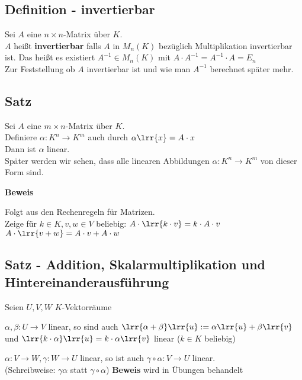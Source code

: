 \subsection{Definition - invertierbar}
	Sei $A$ eine $n\times n$-Matrix über $K$.\\
	$A$ heißt \textbf{invertierbar} falls $A$ in $M_n(K)$ bezüglich Multiplikation invertierbar ist. Das heißt es existiert $A^{-1}\in M_n(K)$ mit $A\cdot A^{-1}=A^{-1}\cdot A=E_n$ \\
	Zur Feststellung ob $A$ invertierbar ist und wie man $A^{-1}$ berechnet später mehr.
	
\subsection{Satz}
	Sei $A$ eine $m\times n$-Matrix über $K$.\\
	Definiere $\alpha:K^n\rightarrow K^m$ auch durch $\alpha\lrr{x}=A\cdot x$\\
	Dann ist $\alpha$ linear.\\
	Später werden wir sehen, dass alle linearen Abbildungen $\alpha:K^n\rightarrow K^m$ von dieser Form sind.
	
	\textbf{Beweis}
	
	Folgt aus den Rechenregeln für Matrizen.\\
	Zeige für $k\in K, v,w\in V$ beliebig: $A\cdot\lrr{k\cdot v}=k\cdot A\cdot v$\\
	$A\cdot\lrr{v+w}=A\cdot v+A\cdot w$
	
\subsection{Satz - Addition, Skalarmultiplikation und Hintereinanderausführung}
	Seien $U,V,W$ $K$-Vektorräume
		\item $\alpha,\beta:U\rightarrow V$ linear, so sind auch $\lrr{\alpha+\beta}\lrr{u}:=\alpha\lrr{u}+\beta\lrr{v}$ und $\lrr{k\cdot\alpha}\lrr{u}=k\cdot\alpha\lrr{v}$ linear ($k\in K$ beliebig)
		\item $\alpha:V\rightarrow W,\gamma:W\rightarrow U$ linear, so ist auch $\gamma\circ\alpha:V\rightarrow U$ linear.\\
			(Schreibweise: $\gamma\alpha$ statt $\gamma\circ\alpha$)
	\subExEnd
	\textbf{Beweis} wird in Übungen behandelt
	
